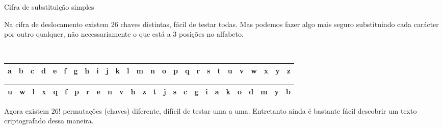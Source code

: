 \begin{frame}{Cifra de substituição simples}{}
\begin{itemize}
\pitem Na cifra de deslocamento existem 26 chaves distintas, fácil de testar todas.
\pitem Mas podemos fazer algo mais seguro substituindo cada carácter por outro qualquer, não necessariamente o que está a 3 posições no alfabeto.
\end{itemize}
\ppause 

\ \\

{\footnotesize
\begin{tabular}{|p{0.14cm}|p{0.14cm}|p{0.14cm}|p{0.14cm}|p{0.14cm}|p{0.14cm}|p{0.14cm}|p{0.14cm}|p{0.14cm}|p{0.14cm}|p{0.14cm}|p{0.14cm}|p{0.14cm}|p{0.14cm}|p{0.14cm}|p{0.14cm}|p{0.14cm}|p{0.14cm}|p{0.14cm}|p{0.14cm}|p{0.14cm}|p{0.14cm}|p{0.14cm}|p{0.14cm}|p{0.14cm}|p{0.14cm}|}
\hline
a & b & c & d & e & f & g & h & i & j & k & l & m & n & o & p & q & r & s & t & u & v & w & x & y & z \\\hline
\end{tabular}

\begin{tabular}{|p{0.14cm}|p{0.14cm}|p{0.14cm}|p{0.14cm}|p{0.14cm}|p{0.14cm}|p{0.14cm}|p{0.14cm}|p{0.14cm}|p{0.14cm}|p{0.14cm}|p{0.14cm}|p{0.14cm}|p{0.14cm}|p{0.14cm}|p{0.14cm}|p{0.14cm}|p{0.14cm}|p{0.14cm}|p{0.14cm}|p{0.14cm}|p{0.14cm}|p{0.14cm}|p{0.14cm}|p{0.14cm}|p{0.14cm}|}
\hline
u & w & l & x & q & f & p & r & e & n & v & h & z & t & j & s & c & g & i & a & k & o & d & m & y & b \\\hline
\end{tabular}}
\end{frame}



\begin{frame}{}{}
\begin{itemize}
\pitem Agora existem $26!$ permutações (chaves) diferente, difícil de testar uma a uma.
\pitem Entretanto ainda é bastante fácil descobrir um texto criptografado dessa maneira.
\end{itemize}
\end{frame}



